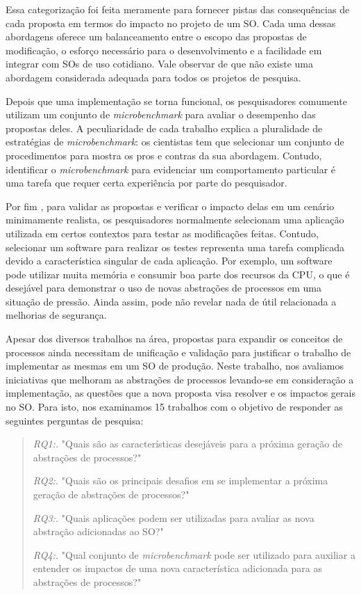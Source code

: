 Essa categorização foi feita meramente para fornecer pistas das consequências
de cada proposta em termos do impacto no projeto de um SO. Cada uma dessas
abordagens oferece um balanceamento entre o escopo das propostas de
modificação, o esforço necessário para o desenvolvimento e a facilidade em
integrar com SOs de uso cotidiano. Vale observar de que não existe uma
abordagem considerada adequada para todos os projetos de pesquisa.

Depois que uma implementação se torna funcional, os pesquisadores comumente
utilizam um conjunto de \emph{microbenchmark} para avaliar o desempenho das
propostas deles. A peculiaridade de cada trabalho explica a pluralidade de
estratégias de \emph{microbenchmark}: os cientistas tem que selecionar um
conjunto de procedimentos para mostra os pros e contras da sua abordagem.
Contudo, identificar o \emph{microbenchmark} para evidenciar um comportamento
particular é uma tarefa que requer certa experiência por parte do pesquisador.

Por fim , para validar as propostas e verificar o impacto delas em um cenário
minimamente realista, os pesquisadores normalmente selecionam uma aplicação
utilizada em certos contextos para testar as modificações feitas. Contudo,
selecionar um software para realizar os testes representa uma tarefa complicada
devido a característica singular de cada aplicação. Por exemplo, um software
pode utilizar muita memória e consumir boa parte dos recursos da CPU, o que é
desejável para demonstrar o uso de novas abstrações de processos em uma
situação de pressão. Ainda assim, pode não revelar nada de útil relacionada a
melhorias de segurança.

Apesar dos diversos trabalhos na área, propostas para expandir os conceitos de
processos ainda necessitam de unificação e validação para justificar o trabalho
de implementar as mesmas em um SO de produção. Neste trabalho, nos avaliamos
iniciativas que melhoram as abstrações de processos levando-se em consideração
a implementação, as questões que a nova proposta visa resolver e os impactos
gerais no SO. Para isto, nos examinamos 15 trabalhos com o objetivo de
responder as seguintes perguntas de pesquisa:

\begin{quote}
 \item \textit{RQ1:.} "Quais são as características desejáveis para a próxima geração de abstrações de processos?"
 \item \textit{RQ2:.} "Quais são os principais desafios em se implementar a próxima geração de abstrações de processos?"
 \item \textit{RQ3:.} "Quais aplicações podem ser utilizadas para avaliar as nova abstração adicionadas ao SO?"
 \item \textit{RQ4:.} "Qual conjunto de \emph{microbenchmark} pode ser utilizado para auxiliar a entender os impactos de uma nova característica adicionada para as abstrações de processos?"
\end{quote}

